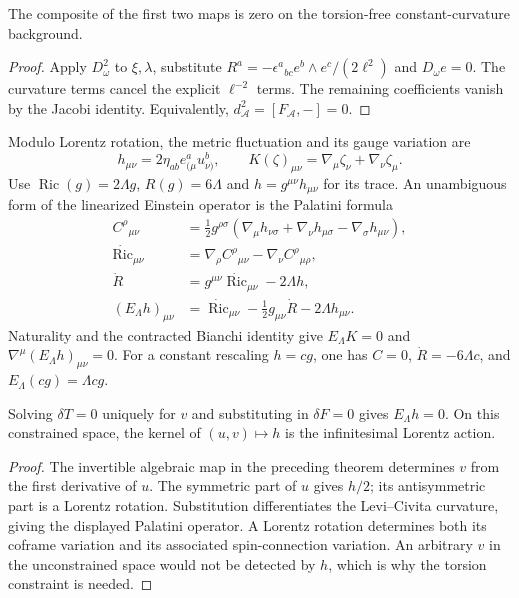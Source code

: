 \begin{proposition}
The composite of the first two maps is zero on the torsion-free
constant-curvature background.
\end{proposition}
\begin{proof}
Apply $D_\omega^2$ to $\xi,\lambda$, substitute
$R^a=-\epsilon^a{}_{bc}e^b\wedge e^c/(2\ell^2)$ and $D_\omega e=0$.
The curvature terms cancel the explicit $\ell^{-2}$ terms. The remaining
coefficients vanish by the Jacobi identity. Equivalently,
$d_{\mathcal A}^2=[F_{\mathcal A},-]=0$.
\end{proof}

Modulo Lorentz rotation, the metric fluctuation and its gauge variation are
\[
 h_{\mu\nu}=2\eta_{ab}e^a_{(\mu}u^b_{\nu)},\qquad
 K(\zeta)_{\mu\nu}=\nabla_\mu\zeta_\nu+\nabla_\nu\zeta_\mu.
\]
Use $\operatorname{Ric}(g)=2\Lambda g$, $R(g)=6\Lambda$ and
$h=g^{\mu\nu}h_{\mu\nu}$ for its trace. An unambiguous form of the
linearized Einstein operator is the Palatini formula
\[
\begin{aligned}
 C^\rho{}_{\mu\nu}
  &=\tfrac12g^{\rho\sigma}
     (\nabla_\mu h_{\nu\sigma}+\nabla_\nu h_{\mu\sigma}
                        -\nabla_\sigma h_{\mu\nu}),\\
 \dot{\operatorname{Ric}}_{\mu\nu}
  &=\nabla_\rho C^\rho{}_{\mu\nu}-\nabla_\nu C^\rho{}_{\mu\rho},\\
 \dot R&=g^{\mu\nu}\dot{\operatorname{Ric}}_{\mu\nu}-2\Lambda h,\\
 (E_\Lambda h)_{\mu\nu}
  &=\dot{\operatorname{Ric}}_{\mu\nu}-\tfrac12g_{\mu\nu}\dot R
                                  -2\Lambda h_{\mu\nu}.
\end{aligned}
\]
Naturality and the contracted Bianchi identity give
$E_\Lambda K=0$ and $\nabla^\mu(E_\Lambda h)_{\mu\nu}=0$.
For a constant rescaling $h=cg$, one has $C=0$, $\dot R=-6\Lambda c$,
and $E_\Lambda(cg)=\Lambda cg$.

\begin{proposition}
Solving $\delta T=0$ uniquely for $v$ and substituting in $\delta F=0$
gives $E_\Lambda h=0$. On this constrained space, the kernel of
$(u,v)\mapsto h$ is the infinitesimal Lorentz action.
\end{proposition}
\begin{proof}
The invertible algebraic map in the preceding theorem determines $v$
from the first derivative of $u$. The symmetric part of $u$ gives $h/2$;
its antisymmetric part is a Lorentz rotation. Substitution differentiates
the Levi--Civita curvature, giving the displayed Palatini operator. A
Lorentz rotation determines both its coframe variation and its associated
spin-connection variation. An arbitrary $v$ in the unconstrained space
would not be detected by $h$, which is why the torsion constraint is needed.
\end{proof}

